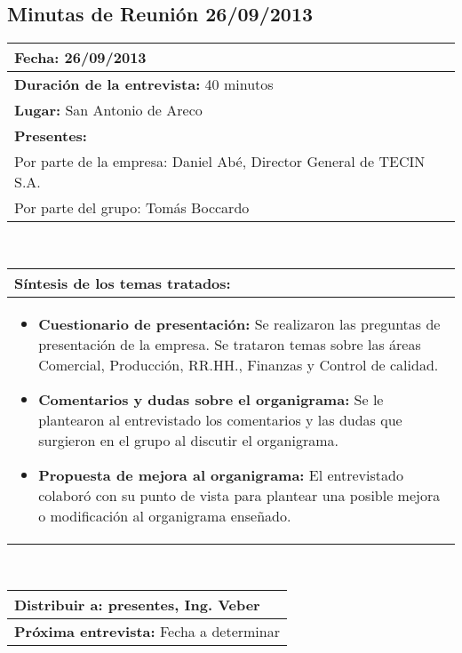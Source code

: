\subsection{Minutas de Reunión 26/09/2013}
\begin{flushleft}
	\begin{tabular}{|p{15cm}|}
		\hline
		\textbf{Fecha:} 26/09/2013 \\ \hline
		\textbf{Duración de la entrevista:} 40 minutos\\ \hline
		\textbf{Lugar:} San Antonio de Areco\\ \hline
		\textbf{Presentes:} \\
			Por parte de la empresa: Daniel Abé, Director General de TECIN S.A. \\ 
			Por parte del grupo: Tomás Boccardo \\ \hline
	\end{tabular}  \\
	\vspace{0.7cm}
	\begin{tabular}{|p{15cm}|}
		\hline
		\textbf{Síntesis de los temas tratados:}\\
		\hline
		\begin{itemize}
			\item \textbf{Cuestionario de presentación:}
			Se realizaron las preguntas de presentación de la empresa. Se trataron temas sobre las áreas Comercial, Producción, RR.HH., Finanzas y Control de calidad.

		\item \textbf{Comentarios y dudas sobre el organigrama:} 
		Se le plantearon al entrevistado los comentarios y las dudas que surgieron en el grupo al discutir el organigrama.

		\item \textbf{Propuesta de mejora al organigrama:} El entrevistado colaboró con su punto de vista para plantear una posible mejora o modificación al organigrama enseñado.

		\end{itemize} \\ \hline
	\end{tabular} \\
	\vspace{0.7cm}
	\begin{tabular}{|p{15cm}|}                
		\hline 
		\textbf{Distribuir a:} presentes, Ing. Veber\\
		\hline
		\textbf{Próxima entrevista:} Fecha a determinar\\
		\hline
	\end{tabular}	
	
\end{flushleft}